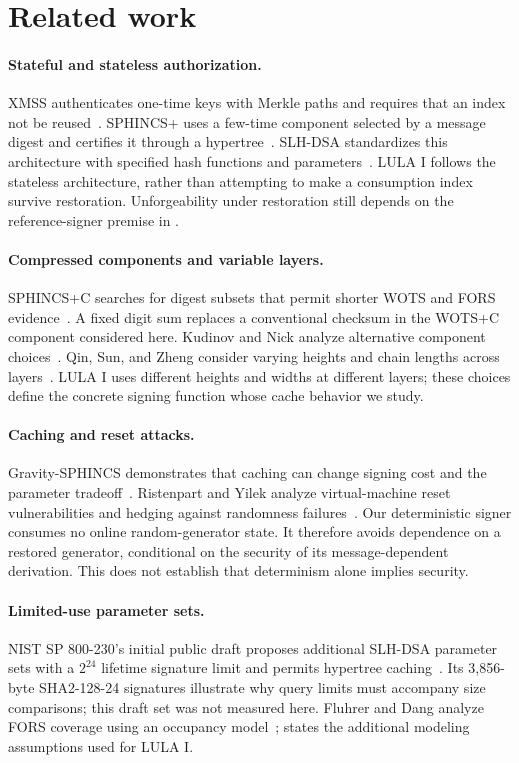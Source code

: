 \documentclass[a4paper,envcountsame,runningheads]{llncs}
\begin{document}
\section{Related work}\label{sec:related}
\paragraph{Stateful and stateless authorization.}
XMSS authenticates one-time keys with Merkle paths and requires that an index not be reused~\cite[Sections~4.1 and 4.1.9]{xmss}. SPHINCS+ uses a few-time component selected by a message digest and certifies it through a hypertree~\cite{sphincs}. SLH-DSA standardizes this architecture with specified hash functions and parameters~\cite{fips205}. LULA I follows the stateless architecture, rather than attempting to make a consumption index survive restoration. Unforgeability under restoration still depends on the reference-signer premise in .

\paragraph{Compressed components and variable layers.}
SPHINCS+C searches for digest subsets that permit shorter WOTS and FORS evidence~\cite{sphincsc}. A fixed digit sum replaces a conventional checksum in the WOTS+C component considered here. Kudinov and Nick analyze alternative component choices~\cite[Sections 5 and 13]{kn}. Qin, Sun, and Zheng consider varying heights and chain lengths across layers~\cite{variable}. LULA I uses different heights and widths at different layers; these choices define the concrete signing function whose cache behavior we study.

\paragraph{Caching and reset attacks.}
Gravity-SPHINCS demonstrates that caching can change signing cost and the parameter tradeoff~\cite{gravity}. Ristenpart and Yilek analyze virtual-machine reset vulnerabilities and hedging against randomness failures~\cite{reset}. Our deterministic signer consumes no online random-generator state. It therefore avoids dependence on a restored generator, conditional on the security of its message-dependent derivation. This does not establish that determinism alone implies security.

\paragraph{Limited-use parameter sets.}
NIST SP 800-230's initial public draft proposes additional SLH-DSA parameter sets with a $2^{24}$ lifetime signature limit and permits hypertree caching~\cite[Table~1 and Section~3]{sp800230}. Its 3,856-byte SHA2-128-24 signatures illustrate why query limits must accompany size comparisons; this draft set was not measured here. Fluhrer and Dang analyze FORS coverage using an occupancy model~\cite[Section~5]{fluhrer};  states the additional modeling assumptions used for LULA I.
\end{document}
